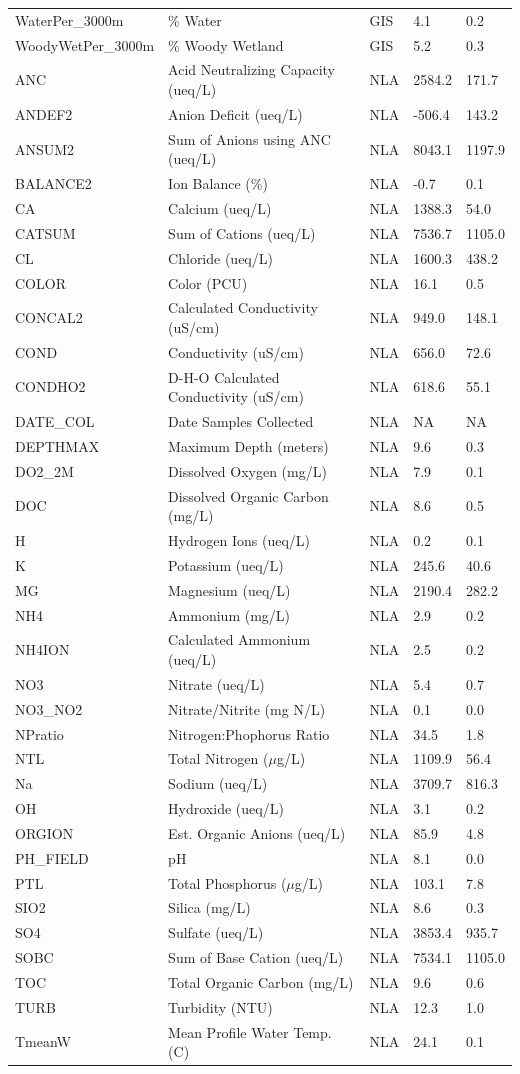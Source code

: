\documentclass[12pt,]{article}
\begin{document}
\begin{longtable}[c]{@{}lllll@{}}
WaterPer\_3000m & \% Water & GIS & 4.1 & 0.2\tabularnewline
WoodyWetPer\_3000m & \% Woody Wetland & GIS & 5.2 & 0.3\tabularnewline
ANC & Acid Neutralizing Capacity (ueq/L) & NLA & 2584.2 &
171.7\tabularnewline
ANDEF2 & Anion Deficit (ueq/L) & NLA & -506.4 & 143.2\tabularnewline
ANSUM2 & Sum of Anions using ANC (ueq/L) & NLA & 8043.1 &
1197.9\tabularnewline
BALANCE2 & Ion Balance (\%) & NLA & -0.7 & 0.1\tabularnewline
CA & Calcium (ueq/L) & NLA & 1388.3 & 54.0\tabularnewline
CATSUM & Sum of Cations (ueq/L) & NLA & 7536.7 & 1105.0\tabularnewline
CL & Chloride (ueq/L) & NLA & 1600.3 & 438.2\tabularnewline
COLOR & Color (PCU) & NLA & 16.1 & 0.5\tabularnewline
CONCAL2 & Calculated Conductivity (uS/cm) & NLA & 949.0 &
148.1\tabularnewline
COND & Conductivity (uS/cm) & NLA & 656.0 & 72.6\tabularnewline
CONDHO2 & D-H-O Calculated Conductivity (uS/cm) & NLA & 618.6 &
55.1\tabularnewline
DATE\_COL & Date Samples Collected & NLA & NA & NA\tabularnewline
DEPTHMAX & Maximum Depth (meters) & NLA & 9.6 & 0.3\tabularnewline
DO2\_2M & Dissolved Oxygen (mg/L) & NLA & 7.9 & 0.1\tabularnewline
DOC & Dissolved Organic Carbon (mg/L) & NLA & 8.6 & 0.5\tabularnewline
H & Hydrogen Ions (ueq/L) & NLA & 0.2 & 0.1\tabularnewline
K & Potassium (ueq/L) & NLA & 245.6 & 40.6\tabularnewline
MG & Magnesium (ueq/L) & NLA & 2190.4 & 282.2\tabularnewline
NH4 & Ammonium (mg/L) & NLA & 2.9 & 0.2\tabularnewline
NH4ION & Calculated Ammonium (ueq/L) & NLA & 2.5 & 0.2\tabularnewline
NO3 & Nitrate (ueq/L) & NLA & 5.4 & 0.7\tabularnewline
NO3\_NO2 & Nitrate/Nitrite (mg N/L) & NLA & 0.1 & 0.0\tabularnewline
NPratio & Nitrogen:Phophorus Ratio & NLA & 34.5 & 1.8\tabularnewline
NTL & Total Nitrogen (\(\mu\)g/L) & NLA & 1109.9 & 56.4\tabularnewline
Na & Sodium (ueq/L) & NLA & 3709.7 & 816.3\tabularnewline
OH & Hydroxide (ueq/L) & NLA & 3.1 & 0.2\tabularnewline
ORGION & Est. Organic Anions (ueq/L) & NLA & 85.9 & 4.8\tabularnewline
PH\_FIELD & pH & NLA & 8.1 & 0.0\tabularnewline
PTL & Total Phosphorus (\(\mu\)g/L) & NLA & 103.1 & 7.8\tabularnewline
SIO2 & Silica (mg/L) & NLA & 8.6 & 0.3\tabularnewline
SO4 & Sulfate (ueq/L) & NLA & 3853.4 & 935.7\tabularnewline
SOBC & Sum of Base Cation (ueq/L) & NLA & 7534.1 & 1105.0\tabularnewline
TOC & Total Organic Carbon (mg/L) & NLA & 9.6 & 0.6\tabularnewline
TURB & Turbidity (NTU) & NLA & 12.3 & 1.0\tabularnewline
TmeanW & Mean Profile Water Temp. (C) & NLA & 24.1 & 0.1\tabularnewline
\bottomrule
\end{longtable}

\newpage
\end{document}
